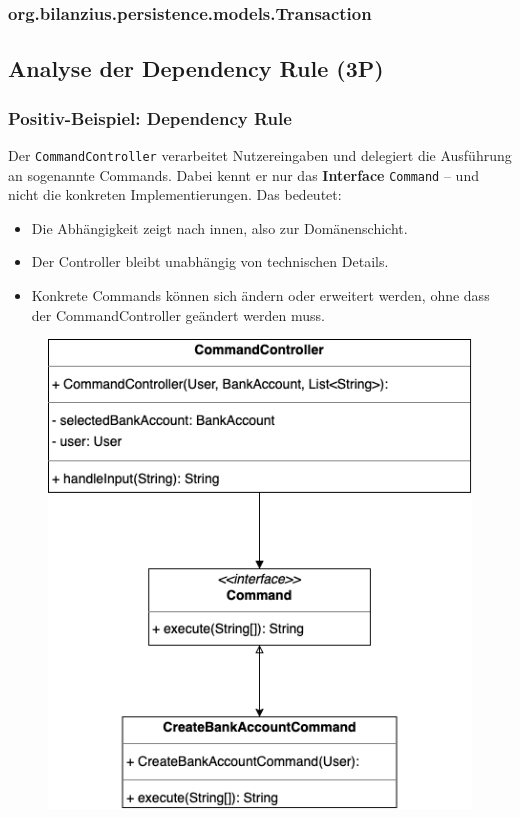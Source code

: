 \subsubsection*{org.bilanzius.persistence.models.Transaction}




\subsection{Analyse der Dependency Rule (3P)}

\subsubsection*{Positiv-Beispiel: Dependency Rule}
Der \texttt{CommandController} verarbeitet Nutzereingaben und delegiert die Ausführung an sogenannte Commands. Dabei kennt er nur das \textbf{Interface} \texttt{Command} – und nicht die konkreten Implementierungen. Das bedeutet:
\begin{itemize}
    \item Die Abhängigkeit zeigt nach innen, also zur Domänenschicht.
    \item Der Controller bleibt unabhängig von technischen Details.
    \item Konkrete Commands können sich ändern oder erweitert werden, ohne dass der CommandController geändert werden muss.
\end{itemize}

\begin{figure}[htbp]
    \centering
    \includegraphics[width=0.7\linewidth]{kapitel2_architektur/DepRulPos.png}
\end{figure}


